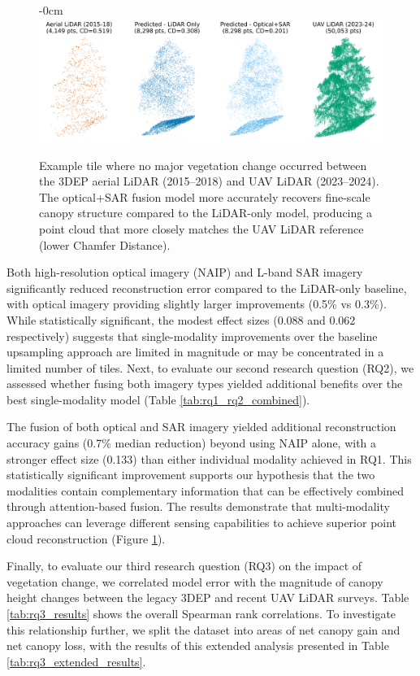 \documentclass[remotesensing,article,submit,pdftex,moreauthors]{Definitions/mdpi}
\newenvironment{widefigure}[1][]{%
  \begin{figure}[#1]\begin{adjustwidth}{-\extralength}{0cm}\centering}{%
  \end{adjustwidth}\end{figure}}
\begin{document}
\begin{widefigure}
    \vspace{-20pt}  
    \centering
    \includegraphics[width=1\linewidth]{manuscript/figures/model_output_example.png}
    \caption{Example tile where no major vegetation change occurred between the 3DEP aerial LiDAR (2015--2018) and UAV LiDAR (2023--2024). The optical+SAR fusion model more accurately recovers fine-scale canopy structure compared to the LiDAR-only model, producing a point cloud that more closely matches the UAV LiDAR reference (lower Chamfer Distance).}
    \label{fig:model_output_example}
\end{widefigure}


Both high-resolution optical imagery (NAIP) and L-band SAR imagery significantly reduced reconstruction error compared to the LiDAR-only baseline, with optical imagery providing slightly larger improvements (0.5\% vs 0.3\%). While statistically significant, the modest effect sizes (0.088 and 0.062 respectively) suggests that single-modality improvements over the baseline upsampling approach are limited in magnitude or may be concentrated in a limited number of tiles. Next, to evaluate our second research question (RQ2), we assessed whether fusing both imagery types yielded additional benefits over the best single-modality model (Table \ref{tab:rq1_rq2_combined}).


The fusion of both optical and SAR imagery yielded additional reconstruction accuracy gains (0.7\% median reduction) beyond using NAIP alone, with a stronger effect size (0.133) than either individual modality achieved in RQ1. This statistically significant improvement supports our hypothesis that the two modalities contain complementary information that can be effectively combined through attention-based fusion. The results demonstrate that multi-modality approaches can leverage different sensing capabilities to achieve superior point cloud reconstruction (Figure \ref{fig:model_output_example}).

Finally, to evaluate our third research question (RQ3) on the impact of vegetation change, we correlated model error with the magnitude of canopy height changes between the legacy 3DEP and recent UAV LiDAR surveys. Table \ref{tab:rq3_results} shows the overall Spearman rank correlations. To investigate this relationship further, we split the dataset into areas of net canopy gain and net canopy loss, with the results of this extended analysis presented in Table \ref{tab:rq3_extended_results}.
\end{document}

